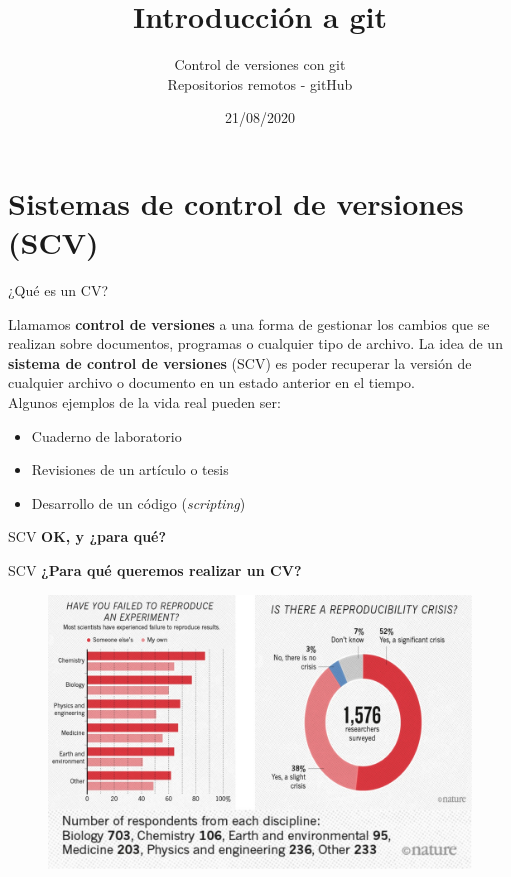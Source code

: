 \documentclass{beamer}
\title[Introducción a git]{\textbf{Introducción a git}}
\author[Nico Lois basado en apuntes de Risaro, D.]{Control de versiones con git \\ Repositorios remotos - gitHub}
\institute[]{}
\date{21/08/2020}
\begin{document}
\maketitle

\section{Sistemas de control de versiones (SCV)}
\begin{frame}{¿Qué es un CV?}

Llamamos \textbf{control de versiones} a una forma de gestionar los cambios que se realizan sobre documentos, programas o cualquier tipo de archivo. La idea de un \textbf{sistema de control de versiones} (SCV) es poder recuperar la versión  de cualquier archivo o documento en un estado anterior en el tiempo.\\

Algunos ejemplos de la vida real pueden ser:

\begin{itemize}
    \item Cuaderno de laboratorio 
    \item Revisiones de un artículo o tesis
    \item Desarrollo de un código (\textit{scripting})
\end{itemize}
\end{frame}

\begin{frame}{SCV}
\textbf{OK, y ¿para qué?}

\end{frame}

\begin{frame}{SCV}
\textbf{¿Para qué queremos realizar un CV?}
\begin{figure}
    \centering
    \includegraphics[scale=0.35]{reproducibility_nature.jpg}
\end{figure}
\end{frame}
\end{document}
